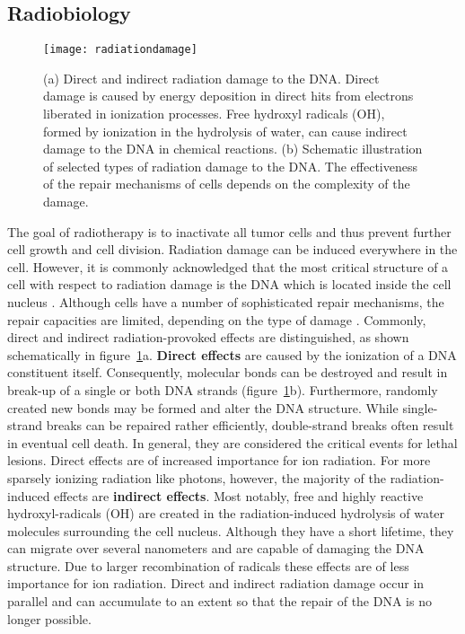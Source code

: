 \subsection{Radiobiology}
\label{sec:background:radiobiology}


%
\begin{figure}[tbp]
  \centering
  \texttt{[image: radiationdamage]}
  \caption[Direct and indirect radiation damage to the \ac{DNA}.] {
    (a) Direct and indirect radiation damage to the \ac{DNA}. Direct
    damage is caused by energy deposition in direct hits from
    electrons liberated in ionization processes. Free hydroxyl
    radicals (OH), formed by ionization in the hydrolysis of water,
    can cause indirect damage to the \ac{DNA} in chemical
    reactions. (b) Schematic illustration of selected types of
    radiation damage to the \ac{DNA}. The effectiveness of the repair
    mechanisms of cells depends on the complexity of the damage. }
  \label{fig:background:radiatdamage}
\end{figure}
The goal of radiotherapy is to inactivate all tumor cells and thus
prevent further cell growth and cell division. Radiation damage can be
induced everywhere in the cell. However, it is commonly acknowledged
that the most critical structure of a cell with respect to radiation
damage is the \acf{DNA} which is located inside the cell nucleus
\citep{Munro1970}. Although cells have a number of sophisticated
repair mechanisms, the repair capacities are limited, depending on the
type of damage \citep{Sancar2004}. Commonly, direct and indirect
radiation-provoked effects are distinguished, as shown schematically
in figure~\ref{fig:background:radiatdamage}a. \textbf{Direct effects}
are caused by the ionization of a \ac{DNA} constituent
itself. Consequently, molecular bonds can be destroyed and result in
break-up of a single or both \ac{DNA} strands
(figure~\ref{fig:background:radiatdamage}b).  Furthermore, randomly
created new bonds may be formed and alter the \ac{DNA}
structure. While single-strand breaks can be repaired rather
efficiently, double-strand breaks often result in eventual cell
death. In general, they are considered the critical events for lethal
lesions. Direct effects are of increased importance for ion
radiation. For more sparsely ionizing radiation like photons, however,
the majority of the radiation-induced effects are \textbf{indirect
  effects}. Most notably, free and highly reactive hydroxyl-radicals
(OH) are created in the radiation-induced hydrolysis of water
molecules surrounding the cell nucleus. Although they have a short
lifetime, they can migrate over several nanometers and are capable of
damaging the \ac{DNA} structure. Due to larger recombination of
radicals these effects are of less importance for ion radiation.
Direct and indirect radiation damage occur in parallel and can
accumulate to an extent so that the repair of the \ac{DNA} is no
longer possible.
 

